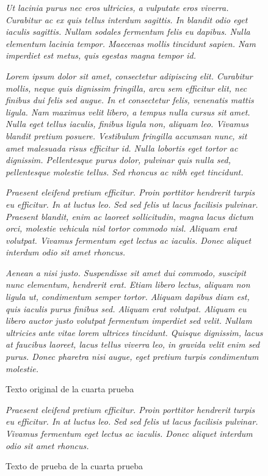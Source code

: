 \documentclass[12pt,twoside]{article}
\begin{document}
\begin{figure}
    \centering
    \textit{Ut lacinia purus nec eros ultricies, a vulputate eros viverra. 
Curabitur ac ex quis tellus interdum sagittis. In blandit odio 
eget iaculis sagittis. Nullam sodales fermentum felis eu dapibus. 
Nulla elementum lacinia tempor. Maecenas mollis tincidunt sapien. 
Nam imperdiet est metus, quis egestas magna tempor id.}

\textit{Lorem ipsum dolor sit amet, consectetur adipiscing elit. 
Curabitur mollis, neque quis dignissim fringilla, arcu sem 
efficitur elit, nec finibus dui felis sed augue. In et consectetur 
felis, venenatis mattis ligula. Nam maximus velit libero, a tempus nulla 
cursus sit amet. Nulla eget tellus iaculis, finibus ligula non, 
aliquam leo. Vivamus blandit pretium posuere. Vestibulum fringilla 
accumsan nunc, sit amet malesuada risus efficitur id. Nulla 
lobortis eget tortor ac dignissim. Pellentesque purus dolor, 
pulvinar quis nulla sed, pellentesque molestie tellus. Sed rhoncus 
ac nibh eget tincidunt.}

\textit{Praesent eleifend pretium efficitur. Proin porttitor hendrerit 
turpis eu efficitur. In at luctus leo. Sed sed felis ut lacus 
facilisis pulvinar. Praesent blandit, enim ac laoreet sollicitudin, 
magna lacus dictum orci, molestie vehicula nisl tortor commodo nisl. 
Aliquam erat volutpat. Vivamus fermentum eget lectus ac iaculis. 
Donec aliquet interdum odio sit amet rhoncus.}


\textit{Aenean a nisi justo. Suspendisse sit amet dui commodo, 
suscipit nunc elementum, hendrerit erat. Etiam libero lectus, 
aliquam non ligula ut, condimentum semper tortor. Aliquam dapibus 
diam est, quis iaculis purus finibus sed. Aliquam erat volutpat. 
Aliquam eu libero auctor justo volutpat fermentum imperdiet sed 
velit. Nullam ultricies ante vitae lorem ultrices tincidunt. 
Quisque dignissim, lacus at faucibus laoreet, lacus tellus viverra 
leo, in gravida velit enim sed purus. Donec pharetra nisi augue, 
eget pretium turpis condimentum molestie.}
    \caption{Texto original de la cuarta prueba}
    \label{fig:texto41}
\end{figure}

\begin{figure}
    \centering
    \textit{Praesent eleifend pretium efficitur. Proin porttitor hendrerit 
turpis eu efficitur. In at luctus leo. Sed sed felis ut lacus 
facilisis pulvinar. Vivamus fermentum eget lectus ac iaculis. 
Donec aliquet interdum odio sit amet rhoncus.}
    \caption{Texto de prueba de la cuarta prueba}
    \label{fig:texto42}
\end{figure}
\end{document}
